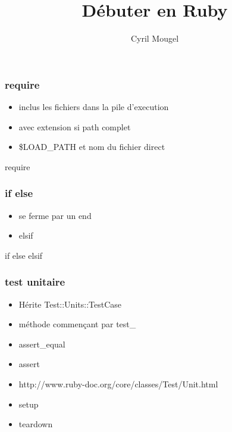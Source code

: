 \documentclass{beamer}
\title{D\'ebuter en Ruby}
\author{Cyril Mougel}
\begin{document}
\begin{frame}
  \titlepage
\end{frame}

\begin{frame}
  \frametitle{require}
  \begin{itemize}
    \item inclus les fichiers dans la pile d'execution
    \item avec extension si path complet
    \item \$LOAD\_PATH et nom du fichier direct
  \end{itemize}
\end{frame}

\begin{frame}
  \begin{beamerboxesrounded}{require}
    
  \end{beamerboxesrounded}
\end{frame}

\begin{frame}
  \frametitle{if else}
  \begin{itemize}
    \item se ferme par un end
    \item elsif
  \end{itemize}
\end{frame}

\begin{frame}
  \begin{beamerboxesrounded}{if else elsif}
    
  \end{beamerboxesrounded}
\end{frame}

\begin{frame}
  \frametitle{test unitaire}
  \begin{itemize}
    \item H\'erite Test::Units::TestCase
    \item m\'ethode commençant par test\_
    \item assert\_equal
    \item assert
    \item http://www.ruby-doc.org/core/classes/Test/Unit.html
    \item setup
    \item teardown
  \end{itemize}
\end{frame}
\end{document}
